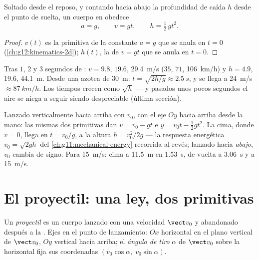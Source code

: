 \begin{proposition}\label{prop:g12:projectile-motion:vertical}
Soltado desde el reposo, y contando hacia abajo la profundidad de caída $h$ desde el
punto de suelta, un cuerpo en  obedece
\[
a = g, \qquad v = g t, \qquad h = \tfrac12\, g t^2 .
\]
\end{proposition}

\begin{proof}
$v(t)$ es la primitiva de la constante $a = g$ que se anula en $t = 0$
(\cref{ch:g12:kinematics-2d}); $h(t)$, la de $v = gt$ que se anula en $t = 0$.
\end{proof}

\begin{example}\label{ex:g12:projectile-motion:orders}
Tras $1$, $2$ y $3$ segundos de : $v = 9.8$, $19.6$, \qty{29.4}{m/s} ($35$,
$71$, \qty{106}{km/h}) y $h = 4.9$, $19.6$, \qty{44.1}{m}. Desde una azotea de
\qty{30}{m}: $t = \sqrt{2h/g} \approx \qty{2.5}{s}$, y se llega a \qty{24}{m/s}
$\approx \qty{87}{km/h}$. Los tiempos crecen como $\sqrt h$ --- y pasados unos pocos
segundos el aire se niega a seguir siendo despreciable (última sección).
\end{example}

\begin{example}\label{ex:g12:projectile-motion:throw}
Lanzado verticalmente hacia arriba con $v_0$, con el eje $Oy$ hacia arriba desde la
mano: las mismas dos primitivas dan $v = v_0 - gt$ e $y = v_0 t - \tfrac12 gt^2$. La
cima, donde $v = 0$, llega en $t = v_0/g$, a la altura $h = v_0^2/2g$ --- la respuesta
energética $v_0 = \sqrt{2gh}$ del \cref{ch:g11:mechanical-energy} recorrida al revés;
lanzado hacia \emph{abajo}, $v_0$ cambia de signo. Para \qty{15}{m/s}: cima a
\qty{11.5}{m} en \qty{1.53}{s}, de vuelta a \qty{3.06}{s} y a \qty{15}{m/s}.
\end{example}

\section{El proyectil: una ley, dos primitivas}

\begin{definition}[Proyectil]\label{def:g12:projectile-motion:projectile}
Un \emph{proyectil} es un cuerpo lanzado con una velocidad $\vect v_0$
y abandonado después a la . Ejes en el punto de lanzamiento: $Ox$
horizontal en el plano vertical de $\vect v_0$, $Oy$ vertical hacia arriba; el
\emph{ángulo de tiro} $\alpha$ de $\vect v_0$ sobre la
horizontal fija sus coordenadas $(v_0\cos\alpha,\; v_0\sin\alpha)$.
\end{definition}

